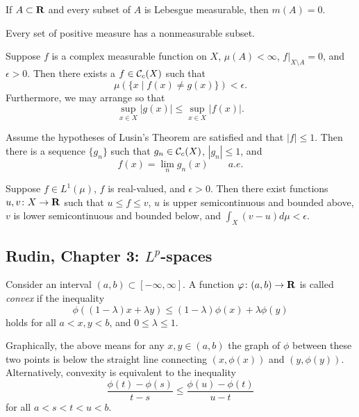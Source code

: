 \begin{theorem}
  If $A \subset \mathbf{R}$ and every subset of $A$ is Lebesgue measurable, then $m(A) = 0$.
\end{theorem}

\begin{corollary}
  Every set of positive measure has a nonmeasurable subset.
\end{corollary}

\begin{theorem}
  Suppose $f$ is a complex measurable function on $X$, $\mu(A) < \infty$, $f|_{X \setminus A} = 0$, and $\epsilon > 0$. Then there exists a $f \in \mathcal{C}_c(X)$ such that
  \[
  \mu(\{ x \;|\; f(x) \neq g(x)\}) < \epsilon.
  \]
  Furthermore, we may arrange so that
  \[
  \sup_{x \in X} |g(x)| \leq \sup_{x \in X} |f(x)|.
  \]
\end{theorem}

\begin{corollary}
  Assume the hypotheses of Lusin's Theorem are satisfied and that $|f| \leq 1$. Then there is a sequence $\{g_n\}$ such that $g_n \in \mathcal{C}_c(X)$, $|g_n| \leq 1$, and
  \[
  f(x) = \lim_n g_n(x) \qquad a.e.
  \]
\end{corollary}

\begin{theorem}
  Suppose $f \in L^1(\mu)$, $f$ is real-valued, and $\epsilon > 0$. Then there exist functions $u, v \colon X \rightarrow \mathbf{R}$ such that $u \leq f \leq v$, $u$ is upper semicontinuous and bounded above, $v$ is lower semicontinuous and bounded below, and $\int_X (v - u) d\mu < \epsilon$.
\end{theorem}

\subsection{Rudin, Chapter 3: $L^p$-spaces}

\begin{definition}
  Consider an interval $(a,b) \subset [-\infty,\infty]$. A function $\varphi \colon (a,b) \rightarrow \mathbf{R}$ is called \emph{convex} if the inequality
  \[
  \phi((1-\lambda) x + \lambda y) \leq (1-\lambda) \phi(x) + \lambda \phi(y)
  \]
  holds for all $a < x,y < b$, and $0 \leq \lambda \leq 1$.

  Graphically, the above means for any $x,y \in (a,b)$ the graph of $\phi$ between these two points is below the straight line connecting $(x,\phi(x))$ and $(y,\phi(y))$. Alternatively, convexity is equivalent to the inequality
  \[
  \frac{\phi(t)-\phi(s)}{t-s} \leq \frac{\phi(u)-\phi(t)}{u-t}
  \]
  for all $a < s < t < u < b$.
\end{definition}

